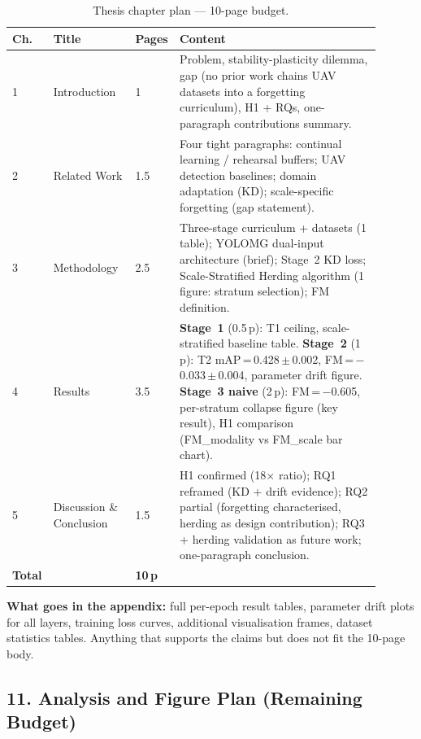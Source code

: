 \begin{table}[h]
\centering
\caption{Thesis chapter plan — 10-page budget.}
\small
\begin{tabular}{p{0.04\linewidth}p{0.22\linewidth}p{0.10\linewidth}p{0.54\linewidth}}
\hline
\textbf{Ch.} & \textbf{Title} & \textbf{Pages} & \textbf{Content} \\
\hline
1 & Introduction &
1 &
Problem, stability-plasticity dilemma, gap (no prior work
chains UAV datasets into a forgetting curriculum),
H1 + RQs, one-paragraph contributions summary. \\[4pt]

2 & Related Work &
1.5 &
Four tight paragraphs: continual learning / rehearsal buffers;
UAV detection baselines; domain adaptation (KD);
scale-specific forgetting (gap statement). \\[4pt]

3 & Methodology &
2.5 &
Three-stage curriculum + datasets (1 table);
YOLOMG dual-input architecture (brief);
Stage~2 KD loss;
Scale-Stratified Herding algorithm (1 figure: stratum selection);
FM definition. \\[4pt]

4 & Results &
3.5 &
\textbf{Stage~1} (0.5\,p): T1 ceiling, scale-stratified baseline table.
\textbf{Stage~2} (1\,p): T2 mAP\,=\,0.428\,$\pm$\,0.002,
FM\,=\,$-$0.033\,$\pm$\,0.004, parameter drift figure.
\textbf{Stage~3 naive} (2\,p): FM\,=\,$-$0.605,
per-stratum collapse figure (key result),
H1 comparison (FM\_modality vs FM\_scale bar chart). \\[4pt]

5 & Discussion \& Conclusion &
1.5 &
H1 confirmed (18$\times$ ratio);
RQ1 reframed (KD + drift evidence);
RQ2 partial (forgetting characterised, herding as design contribution);
RQ3 + herding validation as future work;
one-paragraph conclusion. \\
\hline
\textbf{Total} & & \textbf{10\,p} & \\
\hline
\end{tabular}
\end{table}

\noindent \textbf{What goes in the appendix:} full per-epoch result tables,
parameter drift plots for all layers, training loss curves, additional
visualisation frames, dataset statistics tables. Anything that supports
the claims but does not fit the 10-page body.

\subsection*{11. Analysis and Figure Plan (Remaining Budget)}

